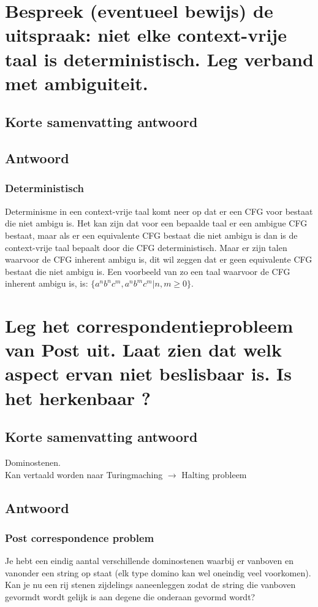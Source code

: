 \documentclass{article}
\begin{document}
\newpage
\section{Bespreek (eventueel bewijs) de uitspraak: niet elke context-vrije taal is deterministisch. Leg verband met ambiguiteit.}
    \subsection{Korte samenvatting antwoord}

    \subsection{Antwoord}
        \subsubsection{Deterministisch}
            Determinisme in een context-vrije taal komt neer op dat er een CFG voor bestaat die niet ambigu is. Het kan zijn dat voor een bepaalde taal er een ambigue CFG bestaat, maar als er een equivalente CFG bestaat die niet ambigu is dan is de context-vrije taal bepaalt door die CFG deterministisch. Maar er zijn talen waarvoor de CFG inherent ambigu is, dit wil zeggen dat er geen equivalente CFG bestaat die niet ambigu is. Een voorbeeld van zo een taal waarvoor de CFG inherent ambigu is, is: $\{a^nb^nc^m,a^nb^mc^m \vert n,m \geq 0 \}$.

\newpage
\section{Leg het correspondentieprobleem van Post uit. Laat zien dat welk aspect ervan niet beslisbaar is. Is het herkenbaar ?}
    \subsection{Korte samenvatting antwoord}
        Dominostenen. \\
        Kan vertaald worden naar Turingmaching $\rightarrow$ Halting probleem
    \subsection{Antwoord}
        \subsubsection{Post correspondence problem}
            Je hebt een eindig aantal verschillende dominostenen waarbij er vanboven en vanonder een string op staat (elk type domino kan wel oneindig veel voorkomen). Kan je nu een rij stenen zijdelings aaneenleggen zodat de string die vanboven gevormdt wordt gelijk is aan degene die onderaan gevormd wordt?
\end{document}
